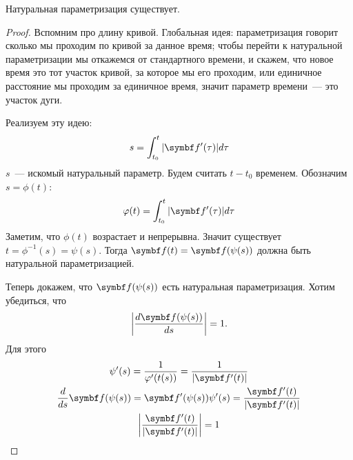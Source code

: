 \documentclass[main]{subfiles}
\begin{document}
\begin{theorem}
    Натуральная параметризация существует.
\end{theorem}
\begin{proof}
    Вспомним про длину кривой.
    Глобальная идея: параметризация говорит сколько мы проходим по кривой за данное время;
    чтобы перейти к натуральной параметризации мы откажемся от стандартного времени,
    и скажем, что новое время это тот участок кривой, за которое мы его проходим, или
    единичное расстояние мы проходим за единичное время, значит параметр времени~--- это участок дуги.

    Реализуем эту идею:
    \[s = \int_{t_0}^t |\vf'(\tau)| d\tau\]
    $s$~--- искомый натуральный параметр.
    Будем считать $t - t_0$ временем.
    Обозначим $s = \phi(t)$:
    \[\phi(t) = \int_{t_0}^t |\vf'(\tau)| d\tau\]
    Заметим, что $\phi(t)$ возрастает и непрерывна.
    Значит существует $t = \phi^{-1}(s)  = \psi(s)$.
    Тогда $\vf(t) = \vf(\psi(s))$ должна быть натуральной параметризацией.

    Теперь докажем, что $\vf(\psi(s))$ есть натуральная параметризация.
    Хотим убедиться, что
    \[\left| \frac{d \vf(\psi(s))}{ds}\right| = 1.\]
    Для этого
    \begin{gather*}
        \psi'(s) = \frac{1}{\phi'(t(s))} = \frac{1}{|\vf'(t)|}\\
        \frac{d}{ds}\vf(\psi(s)) = \vf'(\psi(s)) \psi'(s) = \frac{\vf'(t)}{|\vf'(t)|}\\
        \left| \frac{\vf'(t)}{|\vf'(t)|} \right| = 1
    \end{gather*}
\end{proof}
\end{document}
